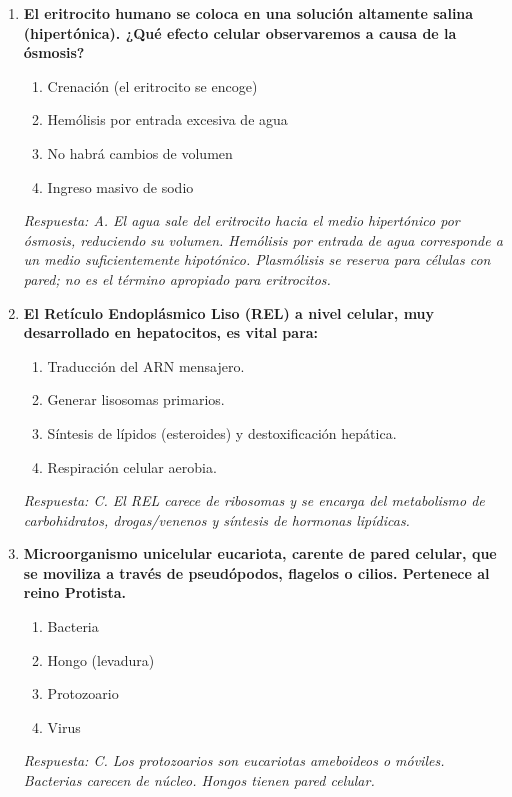 \begin{enumerate}[label=\textbf{\arabic*.}]
    \item \textbf{El eritrocito humano se coloca en una solución altamente salina (hipertónica). ¿Qué efecto celular observaremos a causa de la ósmosis?}
    \begin{enumerate}
        \item[A)] Crenación (el eritrocito se encoge)
        \item[B)] Hemólisis por entrada excesiva de agua
        \item[C)] No habrá cambios de volumen
        \item[D)] Ingreso masivo de sodio
    \end{enumerate}
    \textit{Respuesta: A. El agua sale del eritrocito hacia el medio hipertónico por ósmosis, reduciendo su volumen. Hemólisis por entrada de agua corresponde a un medio suficientemente hipotónico. Plasmólisis se reserva para células con pared; no es el término apropiado para eritrocitos.}

    \item \textbf{El Retículo Endoplásmico Liso (REL) a nivel celular, muy desarrollado en hepatocitos, es vital para:}
    \begin{enumerate}
        \item[A)] Traducción del ARN mensajero.
        \item[B)] Generar lisosomas primarios.
        \item[C)] Síntesis de lípidos (esteroides) y destoxificación hepática.
        \item[D)] Respiración celular aerobia.
    \end{enumerate}
    \textit{Respuesta: C. El REL carece de ribosomas y se encarga del metabolismo de carbohidratos, drogas/venenos y síntesis de hormonas lipídicas.}

    \item \textbf{Microorganismo unicelular eucariota, carente de pared celular, que se moviliza a través de pseudópodos, flagelos o cilios. Pertenece al reino Protista.}
    \begin{enumerate}
        \item[A)] Bacteria
        \item[B)] Hongo (levadura)
        \item[C)] Protozoario
        \item[D)] Virus
    \end{enumerate}
    \textit{Respuesta: C. Los protozoarios son eucariotas ameboideos o móviles. Bacterias carecen de núcleo. Hongos tienen pared celular.}


\end{enumerate}
